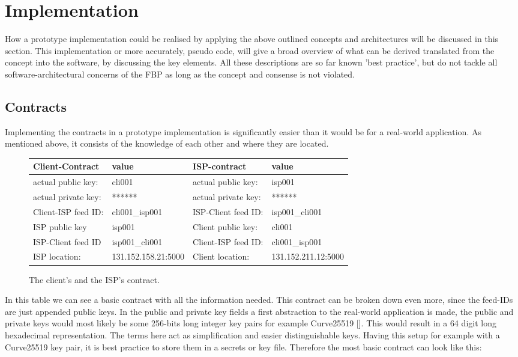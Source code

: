 \chapter{Implementation}
How a prototype implementation could be realised by applying the above outlined concepts and architectures will be discussed in this section. This implementation or more accurately, pseudo code, will give a broad overview of what can be derived translated from the concept into the software, by discussing the key elements. All these descriptions are so far known 'best practice', but do not tackle all software-architectural concerns of the FBP as long as the concept and consense is not violated.
\section{Contracts}
Implementing the contracts in a prototype implementation is significantly easier than it would be for a real-world application. As mentioned above, it consists of the knowledge of each other and where they are located.
\begin{figure}
    
    \begin{center}
        \begin{tabular}{llll} \toprule
            Client-Contract&value&ISP-contract&value\\ \midrule
            actual public key:& cli001 &  actual public key: &isp001  \\ 
            actual private key:& ****** & actual private key:& ****** \\
            Client-ISP feed ID:& cli001\_isp001 &ISP-Client feed ID:&isp001\_cli001 \\ 
            ISP public key&isp001&Client public key:&cli001\\
            ISP-Client feed ID&isp001\_cli001&Client-ISP feed ID:&cli001\_isp001\\
            ISP location:&131.152.158.21:5000 &Client location:& 131.152.211.12:5000 \\\bottomrule
        \end{tabular}
    \end{center}
    \caption{The client's and the ISP's contract.}
\end{figure}

In this table we can see a basic contract with all the information needed. This contract can be broken down even more, since the feed-IDs are just appended public keys. In the public and private key fields a first abstraction to the real-world application is made, the public and private keys would most likely be some 256-bits long integer key pairs for example Curve25519 []. This would result in a 64 digit long hexadecimal representation. The terms here act as simplification and easier distinguishable keys. Having this setup for example with a Curve25519 key pair, it is best practice to store them in a secrets or key file. Therefore the most basic contract can look like this:

